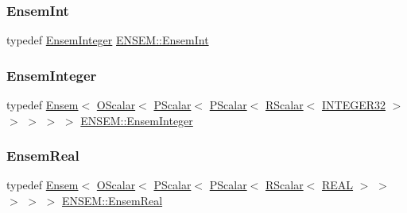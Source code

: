 \mbox{\label{group__defs_ga6d7c35bdb86ebd3d266279dd270ccd74}} 
\subsubsection{\texorpdfstring{EnsemInt}{EnsemInt}}
{\footnotesize\ttfamily typedef \mbox{\hyperlink{group__defs_gab547eddfe397a7c79b9a4278ab384a2e}{Ensem\+Integer}} \mbox{\hyperlink{group__defs_ga6d7c35bdb86ebd3d266279dd270ccd74}{E\+N\+S\+E\+M\+::\+Ensem\+Int}}}

\mbox{\label{group__defs_gab547eddfe397a7c79b9a4278ab384a2e}} 
\subsubsection{\texorpdfstring{EnsemInteger}{EnsemInteger}}
{\footnotesize\ttfamily typedef \mbox{\hyperlink{classENSEM_1_1Ensem}{Ensem}}$<$ \mbox{\hyperlink{classENSEM_1_1OScalar}{O\+Scalar}}$<$ \mbox{\hyperlink{classENSEM_1_1PScalar}{P\+Scalar}}$<$ \mbox{\hyperlink{classENSEM_1_1PScalar}{P\+Scalar}}$<$ \mbox{\hyperlink{classENSEM_1_1RScalar}{R\+Scalar}}$<$ \mbox{\hyperlink{namespaceENSEM_a6a58e5c07422c48c5d547184b36719bf}{I\+N\+T\+E\+G\+E\+R32}} $>$ $>$ $>$ $>$ $>$ \mbox{\hyperlink{group__defs_gab547eddfe397a7c79b9a4278ab384a2e}{E\+N\+S\+E\+M\+::\+Ensem\+Integer}}}

\mbox{\label{group__defs_ga358cdbc11379b9a4724ad42ae64374da}} 
\subsubsection{\texorpdfstring{EnsemReal}{EnsemReal}}
{\footnotesize\ttfamily typedef \mbox{\hyperlink{classENSEM_1_1Ensem}{Ensem}}$<$ \mbox{\hyperlink{classENSEM_1_1OScalar}{O\+Scalar}}$<$ \mbox{\hyperlink{classENSEM_1_1PScalar}{P\+Scalar}}$<$ \mbox{\hyperlink{classENSEM_1_1PScalar}{P\+Scalar}}$<$ \mbox{\hyperlink{classENSEM_1_1RScalar}{R\+Scalar}}$<$ \mbox{\hyperlink{namespaceENSEM_a6dd9aa6508168f545c861787e63ddd1e}{R\+E\+AL}} $>$ $>$ $>$ $>$ $>$ \mbox{\hyperlink{group__defs_ga358cdbc11379b9a4724ad42ae64374da}{E\+N\+S\+E\+M\+::\+Ensem\+Real}}}

